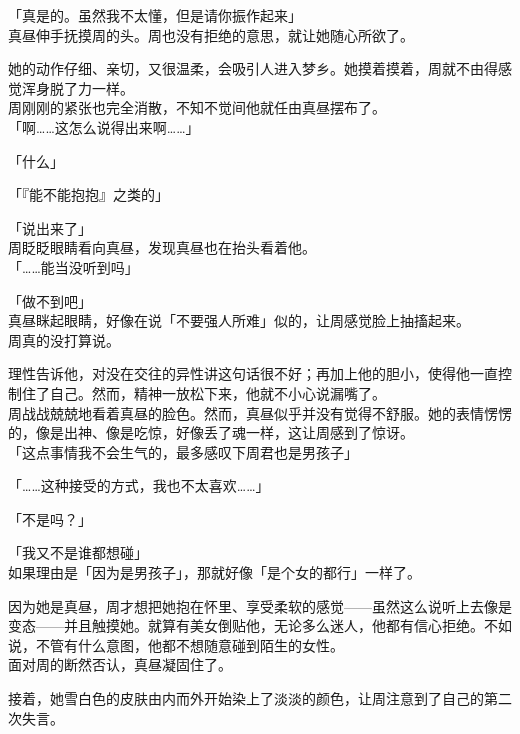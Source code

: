 「真是的。虽然我不太懂，但是请你振作起来」\\

真昼伸手抚摸周的头。周也没有拒绝的意思，就让她随心所欲了。

她的动作仔细、亲切，又很温柔，会吸引人进入梦乡。她摸着摸着，周就不由得感觉浑身脱了力一样。\\

周刚刚的紧张也完全消散，不知不觉间他就任由真昼摆布了。\\

「啊……这怎么说得出来啊……」

「什么」

「『能不能抱抱』之类的」

「说出来了」\\

周眨眨眼睛看向真昼，发现真昼也在抬头看着他。\\

「……能当没听到吗」

「做不到吧」\\

真昼眯起眼睛，好像在说「不要强人所难」似的，让周感觉脸上抽搐起来。\\

周真的没打算说。

理性告诉他，对没在交往的异性讲这句话很不好；再加上他的胆小，使得他一直控制住了自己。然而，精神一放松下来，他就不小心说漏嘴了。\\

周战战兢兢地看着真昼的脸色。然而，真昼似乎并没有觉得不舒服。她的表情愣愣的，像是出神、像是吃惊，好像丢了魂一样，这让周感到了惊讶。\\

「这点事情我不会生气的，最多感叹下周君也是男孩子」

「……这种接受的方式，我也不太喜欢……」

「不是吗？」

「我又不是谁都想碰」\\

如果理由是「因为是男孩子」，那就好像「是个女的都行」一样了。

因为她是真昼，周才想把她抱在怀里、享受柔软的感觉——虽然这么说听上去像是变态——并且触摸她。就算有美女倒贴他，无论多么迷人，他都有信心拒绝。不如说，不管有什么意图，他都不想随意碰到陌生的女性。\\

面对周的断然否认，真昼凝固住了。

接着，她雪白色的皮肤由内而外开始染上了淡淡的颜色，让周注意到了自己的第二次失言。\\

